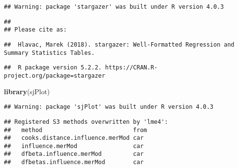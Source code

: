 \documentclass[
]{article}
\newenvironment{Shaded}{\begin{snugshade}}{\end{snugshade}}
\newcommand{\KeywordTok}[1]{\textcolor[rgb]{0.13,0.29,0.53}{\textbf{#1}}}
\newcommand{\NormalTok}[1]{#1}
\begin{document}
\begin{verbatim}
## Warning: package 'stargazer' was built under R version 4.0.3
\end{verbatim}

\begin{verbatim}
## 
## Please cite as:
\end{verbatim}

\begin{verbatim}
##  Hlavac, Marek (2018). stargazer: Well-Formatted Regression and Summary Statistics Tables.
\end{verbatim}

\begin{verbatim}
##  R package version 5.2.2. https://CRAN.R-project.org/package=stargazer
\end{verbatim}

\begin{Shaded}
\begin{Highlighting}[]
\KeywordTok{library}\NormalTok{(sjPlot)}
\end{Highlighting}
\end{Shaded}

\begin{verbatim}
## Warning: package 'sjPlot' was built under R version 4.0.3
\end{verbatim}

\begin{verbatim}
## Registered S3 methods overwritten by 'lme4':
##   method                          from
##   cooks.distance.influence.merMod car 
##   influence.merMod                car 
##   dfbeta.influence.merMod         car 
##   dfbetas.influence.merMod        car
\end{verbatim}
\end{document}
